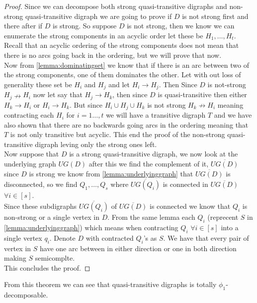 \begin{proof}
    Since we can decompose both strong quasi-transitive digraphs and non-strong quasi-transitive digraph we are going to prove if $D$ is not strong first and there after if $D$ is strong.
    So suppose $D$ is not strong, then we know we can enumerate the strong components in an acyclic order let these be $H_1,\dots , H_t$. \\
    Recall that an acyclic ordering of the strong components does not mean that there is no arcs going back in the ordering, but we will prove that now. \\
    Now from \autoref{lemma:dominatingset} we know that if there is an arc between two of the strong components, one of them dominates the other.
    Let with out loss of generality these set be $H_i$ and $H_j$ and let $H_i\rightarrow H_j$. 
    Then Since $D$ is not-strong $H_j\nrightarrow H_i$ now let say that $H_j \rightarrow H_k$, then since $D$ is quasi-transitive then either $H_k\rightarrow H_i$ or $H_i \rightarrow H_k$. 
    But since $H_i\cup H_j \cup H_k$ is not strong $H_k\nrightarrow H_i$ meaning contracting each $H_i$ for $i=1\dots,t$ we will have a transitive digraph $T$ and we have also shown that there are no backwards going arcs in the ordering meaning that $T$ is not only transitive but acyclic. 
    This end the proof of the non-strong quasi-transitive digraph leving only the strong ones left.\\

    Now suppose that $D$ is a strong quasi-transitive digraph, we now look at the underlying graph $UG(D)$ after this we find the complement of it, $\overline{UG(D)}$ since $D$ is strong we know from \autoref{lemma:underlyinggraph} that $\overline{UG(D)}$ is disconnected, so we find $Q_1,\dots , Q_s$ where $\overline{UG(Q_i)}$ is connected in $\overline{UG(D)}$ $\forall i \in [s]$.\\ 
    Since these subdigraphs $\overline{UG(Q_i)}$ of $\overline{UG(D)}$ is connected we know that $Q_i$ is non-strong or a single vertex in $D$. 
    From the same lemma each $Q_i$ (reprecent $S$ in \autoref{lemma:underlyinggraph}) which means when contracting $Q_i$ $\forall i\in [s]$ into a single vertex $q_i$. 
    Denote $D$ with contracted $Q_i$'s as $S$. 
    We have that every pair of vertex in $S$ have one arc between in either direction or one in both direction making $S$ semicomplte. \\
    This concludes the proof.
\end{proof}
From this theorem we can see that quasi-transitive digraphs is totally $\phi_1$-decomposable. 
